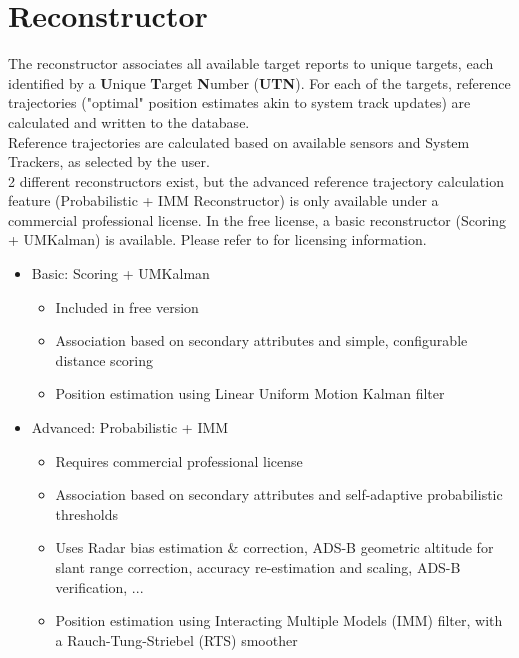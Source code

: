 \chapter{Reconstructor}
\label{sec:reconst} 

The reconstructor associates all available target reports to unique targets, each identified by a \textbf{U}nique \textbf{T}arget \textbf{N}umber (\textbf{UTN}). For each of the targets, reference trajectories ("optimal" position estimates akin to system track updates) are calculated and written to the database. \\

Reference trajectories are calculated based on available sensors and System Trackers, as selected by the user. \\

2 different reconstructors exist, but the advanced reference trajectory calculation feature (Probabilistic + IMM Reconstructor) is only available under a commercial professional license. In the free license, a basic reconstructor (Scoring + UMKalman) is available. Please refer to  for licensing information. \\

\begin{itemize}  
   \item Basic: Scoring + UMKalman
   \begin{itemize}  
   \item Included in free version
   \item Association based on secondary attributes and simple, configurable distance scoring
   \item Position estimation using Linear Uniform Motion Kalman filter
   \end{itemize}  
   \item Advanced: Probabilistic + IMM
   \begin{itemize}  
   \item Requires commercial professional license
   \item Association based on secondary attributes and self-adaptive probabilistic thresholds
   \item Uses Radar bias estimation \& correction, ADS-B geometric altitude for slant range correction, accuracy re-estimation and scaling, ADS-B verification, ...
   \item Position estimation using Interacting Multiple Models (IMM) filter, with a Rauch-Tung-Striebel (RTS) smoother
   \end{itemize}
\end{itemize}  

